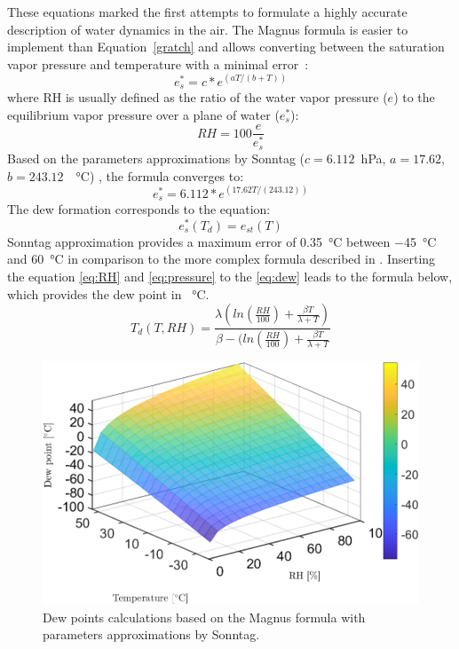 These equations marked the first attempts to formulate a highly accurate description of water dynamics in the air. The Magnus formula is easier to implement than Equation~\ref{gratch} and allows converting between the saturation vapor pressure and temperature with a minimal error~\cite{magnus}: 
\begin{equation}
    e^{*}_{s} = c*e^{(aT/(b+T))}
\end{equation}
where \gls{RH} is usually defined as the ratio of the water vapor pressure ($e$) to the equilibrium vapor pressure over a plane of water ($e^{*}_{s}$):
\begin{equation}
    RH = 100\frac{e}{e^{*}_{s}}
    \label{eq:RH}
\end{equation}
Based on the parameters approximations by Sonntag ($c=6.112$~hPa, $a=17.62$, $b=243.12$~\SI{}{\celsius}) \cite{magnus}, the formula converges to:
\begin{equation}
    e^{*}_{s} = 6.112*e^{(17.62T/(243.12))}
    \label{eq:pressure}
\end{equation}
The dew formation corresponds to the equation:
\begin{equation}
    e^{*}_{s}(T_{d}) = e_{st}(T)
    \label{eq:dew}
\end{equation}
Sonntag approximation provides a maximum error of \SI{0.35}{\celsius} between \SI{-45}{\celsius} and \SI{60}{\celsius} in comparison to the more complex formula described in \cite{hardy}. 
Inserting the equation \ref{eq:RH} and \ref{eq:pressure} to the \ref{eq:dew} leads to the formula below, which provides the dew point in \SI{}{\celsius}.
\begin{equation}
    T_{d}(T, RH) = \frac{\lambda(ln(\frac{RH}{100})+\frac{\beta T}{\lambda + T})}{\beta - (ln(\frac{RH}{100})+\frac{\beta T}{\lambda + T}}
    \label{eq:td}
\end{equation}
\begin{figure}[!h]
\centering
\includegraphics[width=0.65\columnwidth]{Chapter5/images/dewpointmagnus.png}
\caption{Dew points calculations based on the Magnus formula with parameters approximations by Sonntag.}
\label{fig:dewpointmagnus}
\end{figure}

